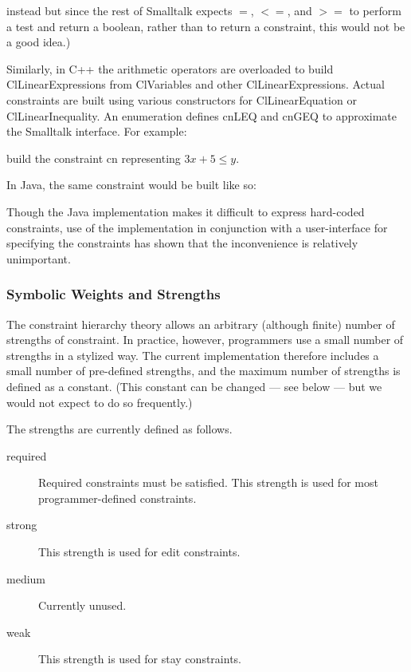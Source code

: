 \documentclass{article}
\begin{document}
instead but since the rest of Smalltalk expects $=$, $<=$, and $>=$ to
perform a test and return a boolean, rather than to return a constraint,
this would not be a good idea.)

Similarly, in C++ the arithmetic operators are overloaded to build {\sf
  ClLinearExpression}s from {\sf ClVariable}s and other {\sf
  ClLinearExpression}s.  Actual constraints are built using various
constructors for {\sf ClLinearEquation} or {\sf ClLinearInequality}.  An
enumeration defines {\sf cnLEQ} and {\sf cnGEQ} to approximate the
Smalltalk interface.  For example:

\hspace*{1 cm}{\sf ClLinearInequality cn(3*x+5, cnLEQ,y); ~ ~ ~ // C++}

build the constraint {\sf cn} representing $3 x + 5 \leq y$.

In Java, the same constraint would be built like so:

\hspace*{1 cm}{\sf ClLinearInequality cn = new
  ClLinearInequality(CL.Plus(CL.Times(x,3),5), CL.LEQ, y);}

Though the Java implementation makes it difficult to express hard-coded
constraints, use of the implementation in conjunction with a
user-interface for specifying the constraints has shown that the
inconvenience is relatively unimportant.

\subsubsection{Symbolic Weights and Strengths}
\label{symweights}

The constraint hierarchy theory allows an arbitrary (although finite)
number of strengths of constraint.  In practice, however, programmers use a
small number of strengths in a stylized way.  The current implementation
therefore includes a small number of pre-defined strengths, and the maximum
number of strengths is defined as a constant.  (This constant can be
changed --- see below --- but we would not expect to do so frequently.)

The strengths are currently defined as follows.

\begin{description}

\item[{\sf required}]  Required constraints must be satisfied.  This
strength is used for most programmer-defined constraints.

\item[{\sf strong}] This strength is used for edit constraints.

\item[{\sf medium}] Currently unused.  

\item[{\sf weak}] This strength is used for stay constraints.

\end{description}
\end{document}
